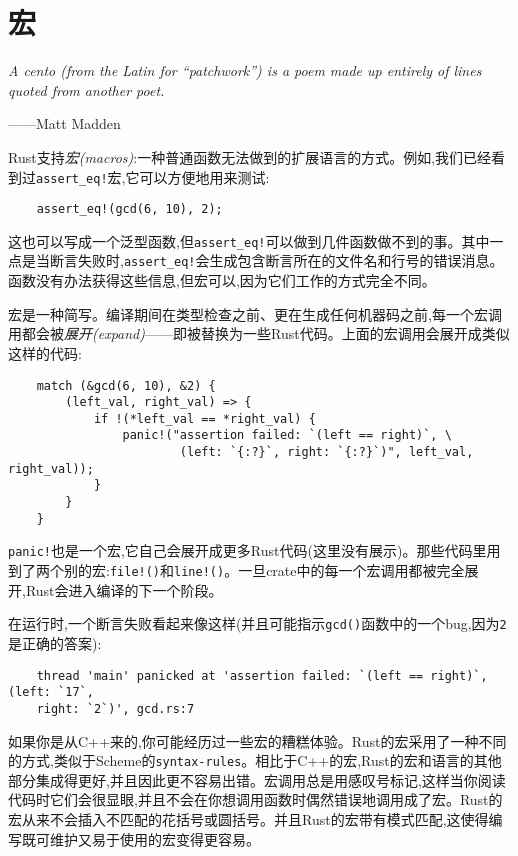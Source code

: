 \chapter{宏}\label{ch21}

\emph{A cento (from the Latin for “patchwork”) is a poem made up entirely of lines quoted from another poet.}
\begin{flushright}
    ——Matt Madden
\end{flushright}

Rust支持\emph{宏(macros)}:一种普通函数无法做到的扩展语言的方式。例如,我们已经看到过\texttt{assert\_eq!}宏,它可以方便地用来测试:
\begin{verbatim}
    assert_eq!(gcd(6, 10), 2);
\end{verbatim}

这也可以写成一个泛型函数,但\texttt{assert\_eq!}可以做到几件函数做不到的事。其中一点是当断言失败时,\texttt{assert\_eq!}会生成包含断言所在的文件名和行号的错误消息。函数没有办法获得这些信息,但宏可以,因为它们工作的方式完全不同。

宏是一种简写。编译期间在类型检查之前、更在生成任何机器码之前,每一个宏调用都会被\emph{展开(expand)}——即被替换为一些Rust代码。上面的宏调用会展开成类似这样的代码:
\begin{verbatim}
    match (&gcd(6, 10), &2) {
        (left_val, right_val) => {
            if !(*left_val == *right_val) {
                panic!("assertion failed: `(left == right)`, \
                        (left: `{:?}`, right: `{:?}`)", left_val, right_val));
            }
        }
    }
\end{verbatim}

\texttt{panic!}也是一个宏,它自己会展开成更多Rust代码(这里没有展示)。那些代码里用到了两个别的宏:\texttt{file!()}和\texttt{line!()}。一旦crate中的每一个宏调用都被完全展开,Rust会进入编译的下一个阶段。

在运行时,一个断言失败看起来像这样(并且可能指示\texttt{gcd()}函数中的一个bug,因为\texttt{2}是正确的答案):
\begin{verbatim}
    thread 'main' panicked at 'assertion failed: `(left == right)`, (left: `17`,
    right: `2`)', gcd.rs:7
\end{verbatim}

如果你是从C++来的,你可能经历过一些宏的糟糕体验。Rust的宏采用了一种不同的方式,类似于Scheme的\texttt{syntax-rules}。相比于C++的宏,Rust的宏和语言的其他部分集成得更好,并且因此更不容易出错。宏调用总是用感叹号标记,这样当你阅读代码时它们会很显眼,并且不会在你想调用函数时偶然错误地调用成了宏。Rust的宏从来不会插入不匹配的花括号或圆括号。并且Rust的宏带有模式匹配,这使得编写既可维护又易于使用的宏变得更容易。

